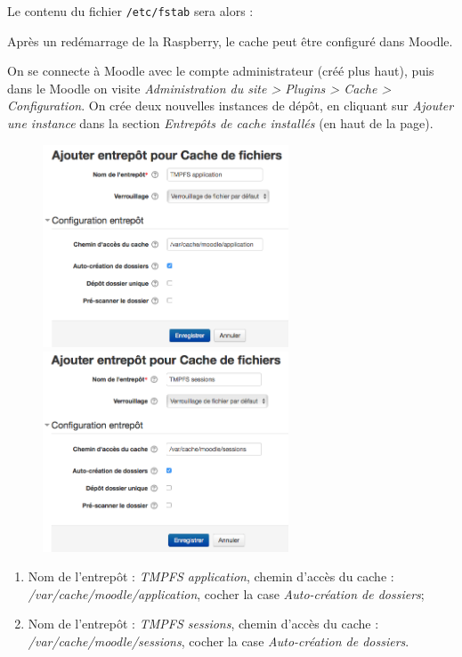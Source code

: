 \documentclass[11pt]{article}
\begin{document}
Le contenu du fichier \lstinline{/etc/fstab} sera alors :


Après un redémarrage de la Raspberry, le cache peut être configuré dans Moodle.

On se connecte à Moodle avec le compte administrateur (créé plus haut), puis dans le Moodle on visite \emph{Administration du site > Plugins > Cache > Configuration}. On crée deux nouvelles instances de dépôt, en cliquant sur \emph{Ajouter une instance} dans la section \emph{Entrepôts de cache installés} (en haut de la page).

\begin{figure}[!ht]
\begin{minipage}[b]{0.45\linewidth} %
\centering
\includegraphics[width=7.3cm]{cache-application.png}
\end{minipage}
\hspace{\fill} %
\begin{minipage}[b]{0.45\linewidth}
\centering
\includegraphics[width=7.3cm]{cache-sessions.png}
\end{minipage}
\end{figure}

\begin{enumerate}
\item Nom de l'entrepôt : \emph{TMPFS application}, chemin d'accès du cache : \emph{/var/cache/moodle/application}, cocher la case \emph{Auto-création de dossiers};
\item Nom de l'entrepôt : \emph{TMPFS sessions}, chemin d'accès du cache : \emph{/var/cache/moodle/sessions}, cocher la case \emph{Auto-création de dossiers}.
\end{enumerate}
\end{document}
